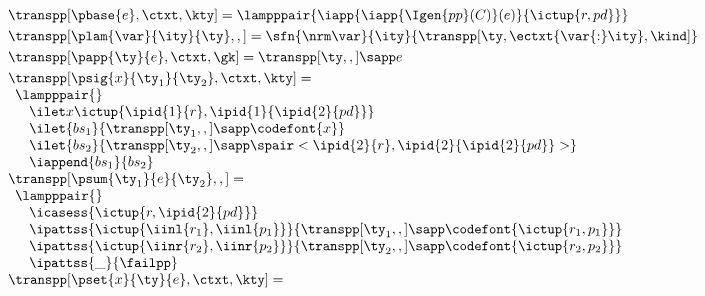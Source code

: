 \begin{figure}
\small
{} 

\[
\begin{array}{l}
\transpp[\pbase{e},\ctxt,\kty] =
  \lampppair{\iapp {\iapp {\Igen{pp}(C)} (e)} {\ictup {r,pd}}}
\\[3pt] %
\transpp[\plam{\var}{\ity}{\ty},,] =
   \sfn{\nrm\var}{\ity}{\transpp[\ty,\ectxt{\var{:}\ity},\kind]}
\\[3pt] %
\transpp[\papp{\ty}{e},\ctxt,\gk] =
  \transpp[\ty,,] \sapp e  
\\[3pt]
\transpp[\psig{x}{\ty_1}{\ty_2},\ctxt,\kty] = \\
  \begin{array}{l}  
    \lampppair{} \\
      \quad  \ilet x {\ictup{\ipid{1}{r},\ipid{1}{\ipid{2}{pd}}}}\\
      \quad  \ilet {bs_1} 
      {{\transpp[\ty_1,,]} \sapp \codefont{x}} \\
      \quad  \ilet {bs_2} 
      {{\transpp[\ty_2,,]} \sapp \spair<\ipid{2}{r},\ipid{2}{\ipid{2}{pd}}>} \\
      \quad \iappend{bs_1}{bs_2}
  \end{array}  
\\
  \transpp[\psum{\ty_1}{e}{\ty_2},,] = \\
  \begin{array}{l}  
  \lampppair{} \\
  \quad \icasess {\ictup{r,\ipid{2}{pd}}} \\
  \quad \ipattss{\ictup{\iinl{r_1}, \iinl{p_1}}} 
	{ {\transpp[\ty_1,,]} \sapp \codefont{\ictup{r_1,p_1}}}\\
  \quad \ipattss{\ictup{\iinr{r_2}, \iinr{p_2}}} 
	{ {\transpp[\ty_2,,]} \sapp \codefont{\ictup{r_2,p_2}}}\\
  \quad \ipattss{\_}  {\failpp}\\
  \end{array}
\\
  \transpp[\pset{x}{\ty}{e},\ctxt,\kty] = \\

\end{array}\]
\end{figure}
